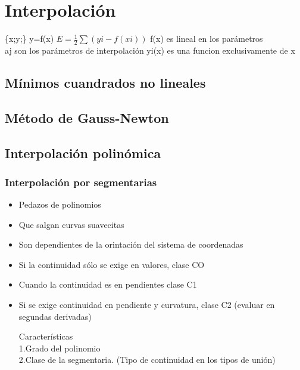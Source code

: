 \chapter{Interpolaci\'on}

\{x;y;\} y=f(x)
$E=\frac{1}{2}\sum(yi-f(xi))$%
f(x) es lineal en los par\'ametros\\
aj son los par\'ametros de interpolaci\'on
yi(x) es una funcion exclusivamente de x



\section{M\'inimos cuandrados no lineales}

\section{M\'etodo de Gauss-Newton}

\section{Interpolaci\'on polin\'omica}
\subsection{Interpolaci\'on por segmentarias}
\begin{itemize}
\item Pedazos de polinomios
\item Que salgan curvas suavecitas
\item Son dependientes de la orintaci\'on del sistema de coordenadas

\item Si la continuidad s\'olo se exige en valores, clase CO
\item Cuando la continuidad es en pendientes clase C1

\item Si se exige continuidad en pendiente y curvatura, clase C2 (evaluar en segundas derivadas)

Caracter\'isticas\\
1.Grado del polinomio\\
2.Clase de la segmentaria. (Tipo de continuidad en los tipos de uni\'on)
\end{itemize}

